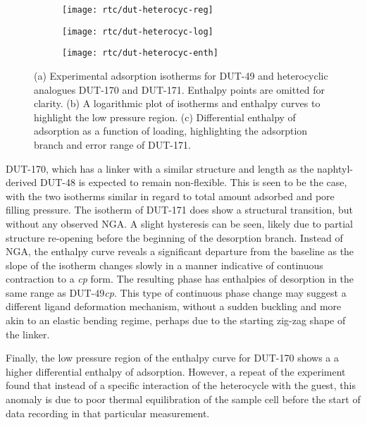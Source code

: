 \begin{figure}[htb]
    \centering
    \begin{subfigure}{0.33\linewidth}
        \texttt{[image: rtc/dut-heterocyc-reg]}%
        \caption{}\label{dut:fig:dut-heterocyc-reg}
    \end{subfigure}%
    \begin{subfigure}{0.33\linewidth}
        \texttt{[image: rtc/dut-heterocyc-log]}%
        \caption{}\label{dut:fig:dut-heterocyc-log}
    \end{subfigure}%
    \begin{subfigure}{0.33\linewidth}
        \texttt{[image: rtc/dut-heterocyc-enth]}%
        \caption{}\label{dut:fig:dut-heterocyc-enth}
    \end{subfigure}%
    \caption{(a) Experimental adsorption isotherms for DUT-49 and 
    heterocyclic analogues DUT-170 and DUT-171. 
    Enthalpy points are omitted for clarity. 
    (b) A logarithmic plot of isotherms and enthalpy curves
    to highlight the low pressure region. 
    (c) Differential enthalpy of adsorption as a function of loading, highlighting the 
    adsorption branch and error range of DUT-171.}%
    \label{dut:fig:dut-heterocyc}
\end{figure}

DUT-170, which has a linker with a similar structure and length as
the naphtyl-derived DUT-48 is expected to remain non-flexible.
This is seen to be the case, with the two isotherms similar in 
regard to total amount adsorbed and pore filling pressure. 
The isotherm of DUT-171 does show a structural transition, 
but without any observed NGA. A slight hysteresis can be seen,
likely due to partial structure re-opening before the beginning 
of the desorption branch. Instead of NGA, the enthalpy curve 
reveals a significant departure from the baseline as the 
slope of the isotherm changes slowly in a manner indicative
of continuous contraction to a \textit{cp} form. The resulting phase 
has enthalpies of desorption in the same range as DUT-49\textit{cp}.
This type of continuous phase change may suggest a different 
ligand deformation mechanism, without a sudden buckling and 
more akin to an elastic bending regime, perhaps due to the 
starting zig-zag shape of the linker.

Finally, the low pressure region of the enthalpy curve for 
DUT-170 shows a a higher differential enthalpy of adsorption.
However, a repeat of the experiment found that instead of 
a specific interaction of the heterocycle with the guest,
this anomaly is due to poor thermal equilibration of the 
sample cell before the start of data recording in that 
particular measurement.

